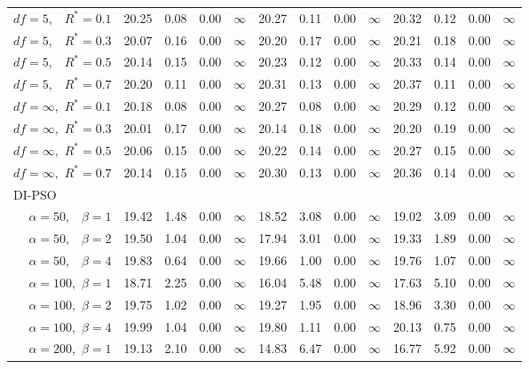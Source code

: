 \documentclass[cmbright]{staauth}
\begin{document}
\begin{table}[ht]
{\begin{tabular}{r|rrrr|rrrr|rrrr}
  $df = 5,\enspace$ $R^* =0.1$ & 20.25 & 0.08 & 0.00 & $\infty$ & 20.27 & 0.11 & 0.00 & $\infty$ & 20.32 & 0.12 & 0.00 & $\infty$ \\
  $df = 5,\enspace$ $R^* =0.3$ & 20.07 & 0.16 & 0.00 & $\infty$ & 20.20 & 0.17 & 0.00 & $\infty$ & 20.21 & 0.18 & 0.00 & $\infty$ \\
  $df = 5,\enspace$ $R^* =0.5$ & 20.14 & 0.15 & 0.00 & $\infty$ & 20.23 & 0.12 & 0.00 & $\infty$ & 20.33 & 0.14 & 0.00 & $\infty$ \\
  $df = 5,\enspace$ $R^* =0.7$ & 20.20 & 0.11 & 0.00 & $\infty$ & 20.31 & 0.13 & 0.00 & $\infty$ & 20.37 & 0.11 & 0.00 & $\infty$ \\
  $df = \infty,$ $R^* =0.1$ & 20.18 & 0.08 & 0.00 & $\infty$ & 20.27 & 0.08 & 0.00 & $\infty$ & 20.29 & 0.12 & 0.00 & $\infty$ \\
  $df = \infty,$ $R^* =0.3$ & 20.01 & 0.17 & 0.00 & $\infty$ & 20.14 & 0.18 & 0.00 & $\infty$ & 20.20 & 0.19 & 0.00 & $\infty$ \\
  $df = \infty,$ $R^* =0.5$ & 20.06 & 0.15 & 0.00 & $\infty$ & 20.22 & 0.14 & 0.00 & $\infty$ & 20.27 & 0.15 & 0.00 & $\infty$ \\
  $df = \infty,$ $R^* =0.7$ & 20.14 & 0.15 & 0.00 & $\infty$ & 20.30 & 0.13 & 0.00 & $\infty$ & 20.36 & 0.14 & 0.00 & $\infty$ \\
\hline
\multicolumn{1}{l|}{DI-PSO} &&&&&&&&&&&&\\
  $\alpha = 50,\enspace$ $\beta =1$ & 19.42 & 1.48 & 0.00 & $\infty$ & 18.52 & 3.08 & 0.00 & $\infty$ & 19.02 & 3.09 & 0.00 & $\infty$ \\
  $\alpha = 50,\enspace$ $\beta =2$ & 19.50 & 1.04 & 0.00 & $\infty$ & 17.94 & 3.01 & 0.00 & $\infty$ & 19.33 & 1.89 & 0.00 & $\infty$ \\
  $\alpha = 50,\enspace$ $\beta =4$ & 19.83 & 0.64 & 0.00 & $\infty$ & 19.66 & 1.00 & 0.00 & $\infty$ & 19.76 & 1.07 & 0.00 & $\infty$ \\
  $\alpha = 100,$ $\beta =1$ & 18.71 & 2.25 & 0.00 & $\infty$ & 16.04 & 5.48 & 0.00 & $\infty$ & 17.63 & 5.10 & 0.00 & $\infty$ \\
  $\alpha = 100,$ $\beta =2$ & 19.75 & 1.02 & 0.00 & $\infty$ & 19.27 & 1.95 & 0.00 & $\infty$ & 18.96 & 3.30 & 0.00 & $\infty$ \\
  $\alpha = 100,$ $\beta =4$ & 19.99 & 1.04 & 0.00 & $\infty$ & 19.80 & 1.11 & 0.00 & $\infty$ & 20.13 & 0.75 & 0.00 & $\infty$ \\
  $\alpha = 200,$ $\beta =1$ & 19.13 & 2.10 & 0.00 & $\infty$ & 14.83 & 6.47 & 0.00 & $\infty$ & 16.77 & 5.92 & 0.00 & $\infty$ \\

\end{tabular}}
\end{table}
\end{document}
